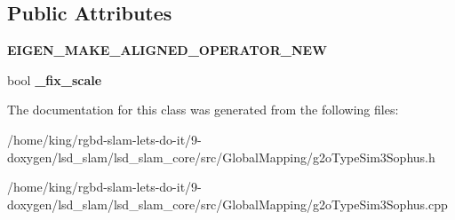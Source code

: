 \subsection*{Public Attributes}
\begin{DoxyCompactItemize}
\item 
\hypertarget{classlsd__slam_1_1_vertex_sim3_ab474766399d0a98c6d66c49433b4decc}{{\bfseries E\-I\-G\-E\-N\-\_\-\-M\-A\-K\-E\-\_\-\-A\-L\-I\-G\-N\-E\-D\-\_\-\-O\-P\-E\-R\-A\-T\-O\-R\-\_\-\-N\-E\-W}}\label{classlsd__slam_1_1_vertex_sim3_ab474766399d0a98c6d66c49433b4decc}

\item 
\hypertarget{classlsd__slam_1_1_vertex_sim3_a7090d5d90f0869db6a4c7760d9a7255e}{bool {\bfseries \-\_\-fix\-\_\-scale}}\label{classlsd__slam_1_1_vertex_sim3_a7090d5d90f0869db6a4c7760d9a7255e}

\end{DoxyCompactItemize}


The documentation for this class was generated from the following files\-:\begin{DoxyCompactItemize}
\item 
/home/king/rgbd-\/slam-\/lets-\/do-\/it/9-\/doxygen/lsd\-\_\-slam/lsd\-\_\-slam\-\_\-core/src/\-Global\-Mapping/g2o\-Type\-Sim3\-Sophus.\-h\item 
/home/king/rgbd-\/slam-\/lets-\/do-\/it/9-\/doxygen/lsd\-\_\-slam/lsd\-\_\-slam\-\_\-core/src/\-Global\-Mapping/g2o\-Type\-Sim3\-Sophus.\-cpp\end{DoxyCompactItemize}
